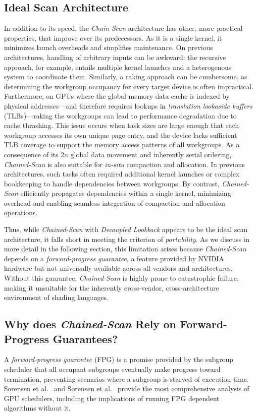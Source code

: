 \documentclass[sigconf]{acmart}
\begin{document}
\subsection{Ideal Scan Architecture}

In addition to its speed, the \emph{Chain-Scan} architecture has other, more practical properties, that improve over its predecessors. As it is a single kernel, it minimizes launch overheads and simplifies maintenance. On previous architectures, handling of arbitrary inputs can be awkward: the recursive approach, for example, entails multiple kernel launches and a heterogenous system to coordinate them. Similarly, a raking approach can be cumbersome, as determining the workgroup occupancy for every target device is often impractical. Furthermore, on GPUs where the global memory data cache is indexed by physical addresses—and therefore requires lookups in \emph{translation lookaside buffers} (TLBs)—raking the workgroups can lead to performance degradation due to cache thrashing. This issue occurs when task sizes are large enough that each workgroup accesses its own unique page entry, and the device lacks sufficient TLB coverage to support the memory access patterns of all workgroups. As a consequence of its $2n$ global data movement and inherently serial ordering, \emph{Chained-Scan} is also suitable for \emph{in-situ} compaction and allocation. In previous architectures, such tasks often required additional kernel launches or complex bookkeeping to handle dependencies between workgroups. By contrast, \emph{Chained-Scan} efficiently propagates dependencies within a single kernel, minimizing overhead and enabling seamless integration of compaction and allocation operations.

Thus, while \emph{Chained-Scan} with \emph{Decoupled Lookback} appears to be the ideal scan architecture, it falls short in meeting the criterion of \emph{portability}. As we discuss in more detail in the following section, this limitation arises because \emph{Chained-Scan} depends on a \emph{forward-progress guarantee}, a feature provided by NVIDIA hardware but not universally available across all vendors and architectures. Without this guarantee, \emph{Chained-Scan} is highly prone to catastrophic failure, making it unsuitable for the inherently cross-vendor, cross-architecture environment of shading languages.

\subsection{Why does \emph{Chained-Scan} Rely on Forward-Progress Guarantees?}
A \emph{forward-progress guarantee} (FPG) is a promise provided by the subgroup scheduler that all occupant subgroups eventually make progress toward termination, preventing scenarios where a subgroup is starved of execution time. Sorensen et al.~\cite{} and Sorensen et al.~\cite{} provide the most comprehensive analysis of GPU schedulers, including the implications of running FPG dependent algorithms without it.
\end{document}
